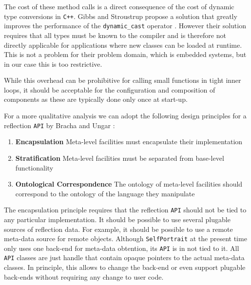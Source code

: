 The cost of these method calls is a direct consequence of the cost of dynamic type conversions in \texttt{C++}. Gibbs and Stroustrup propose
a solution that greatly improves the performance of the \texttt{dynamic\_cast} operator \cite{Gibbs}. However their solution requires that
all types must be known to the compiler and is therefore not directly applicable for applications where new classes can be loaded at runtime.
This is not a problem for their problem domain, which is embedded systems, but in our case this is too restrictive.

While this overhead can be prohibitive for calling small functions in tight inner loops, it should be acceptable for the configuration and composition
of components as these are typically done only once at start-up.

For a more qualitative analysis we can adopt the following design principles for a reflection \texttt{API} by Bracha and Ungar \cite{Bracha}:

\begin{enumerate}
 \item \textbf{Encapsulation} Meta-level facilities must encapsulate their implementation
 \item \textbf{Stratification} Meta-level facilities must be separated from base-level functionality
 \item \textbf{Ontological Correspondence} The ontology of meta-level facilities should correspond to the ontology of the language they manipulate
\end{enumerate}

The encapsulation principle requires that the reflection \texttt{API} should not be tied to any particular implementation. It should be possible
to use several plugable sources of reflection data. For example, it should be possible to use a remote meta-data source for remote objects.
Although \texttt{SelfPortrait} at the present time only uses one back-end for meta-data obtention, its \texttt{API} is in not tied to it. All \texttt{API}
classes are just handle that contain opaque pointers to the actual meta-data classes. In principle, this allows to change the back-end or even
support plugable back-ends without requiring any change to user code.

